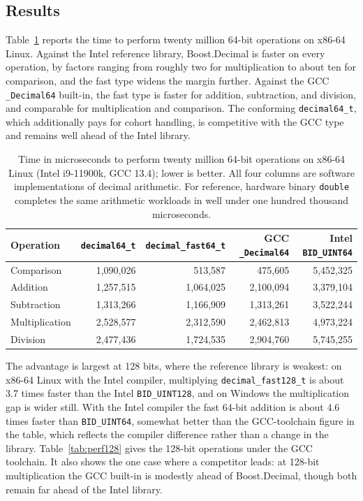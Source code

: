 \documentclass[acmsmall]{acmart}
\begin{document}
\subsection{Results}
Table~\ref{tab:perf} reports the time to perform twenty million 64-bit operations on
x86-64 Linux. Against the Intel reference library, Boost.Decimal is faster on every
operation, by factors ranging from roughly two for multiplication to about ten for
comparison, and the fast type widens the margin further. Against the GCC
\texttt{\_Decimal64} built-in, the fast type is faster for addition, subtraction, and
division, and comparable for multiplication and comparison. The conforming
\texttt{decimal64\_t}, which additionally pays for cohort handling, is competitive with
the GCC type and remains well ahead of the Intel library.

\begin{table}
  \caption{Time in microseconds to perform twenty million 64-bit operations on x86-64
    Linux (Intel i9-11900k, GCC 13.4); lower is better. All four columns are software
    implementations of decimal arithmetic. For reference, hardware binary
    \texttt{double} completes the same arithmetic workloads in well under one hundred
    thousand microseconds.}
  \label{tab:perf}
  \footnotesize
  \begin{tabular}{lrrrr}
    \toprule
    Operation & \texttt{decimal64\_t} & \texttt{decimal\_fast64\_t} & GCC \texttt{\_Decimal64} & Intel \texttt{BID\_UINT64} \\
    \midrule
    Comparison     & 1,090,026 & 513,587   & 475,605   & 5,452,325 \\
    Addition       & 1,257,515 & 1,064,025 & 2,100,094 & 3,379,104 \\
    Subtraction    & 1,313,266 & 1,166,909 & 1,313,261 & 3,522,244 \\
    Multiplication & 2,528,577 & 2,312,590 & 2,462,813 & 4,973,224 \\
    Division       & 2,477,436 & 1,724,535 & 2,904,760 & 5,745,255 \\
    \bottomrule
  \end{tabular}
\end{table}

The advantage is largest at 128 bits, where the reference library is weakest: on x86-64
Linux with the Intel compiler, multiplying \texttt{decimal\_fast128\_t} is about
3.7 times faster than the Intel \texttt{BID\_UINT128}, and on Windows the multiplication
gap is wider still. With the Intel compiler the fast 64-bit addition is about 4.6 times
faster than \texttt{BID\_UINT64}, somewhat better than the GCC-toolchain figure in the
table, which reflects the compiler difference rather than a change in the library.
Table~\ref{tab:perf128} gives the 128-bit operations under the GCC toolchain. It also shows
the one case where a competitor leads: at 128-bit multiplication the GCC built-in is
modestly ahead of Boost.Decimal, though both remain far ahead of the Intel library.
\end{document}
